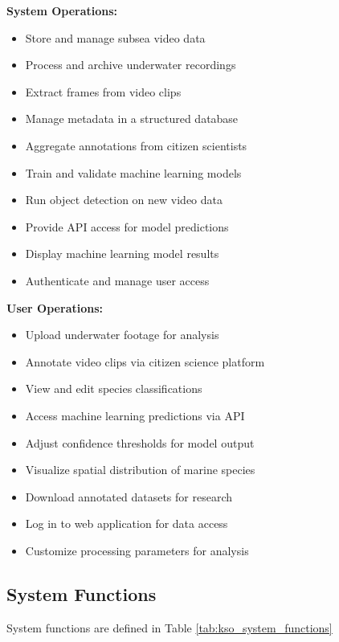 \textbf{System Operations:}
\begin{itemize}
    \item Store and manage subsea video data
    \item Process and archive underwater recordings
    \item Extract frames from video clips
    \item Manage metadata in a structured database
    \item Aggregate annotations from citizen scientists
    \item Train and validate machine learning models
    \item Run object detection on new video data
    \item Provide API access for model predictions
    \item Display machine learning model results
    \item Authenticate and manage user access
\end{itemize}
\textbf{User Operations:}
\begin{itemize}
    \item Upload underwater footage for analysis
    \item Annotate video clips via citizen science platform
    \item View and edit species classifications
    \item Access machine learning predictions via API
    \item Adjust confidence thresholds for model output
    \item Visualize spatial distribution of marine species
    \item Download annotated datasets for research
    \item Log in to web application for data access
    \item Customize processing parameters for analysis
\end{itemize}

\subsection{System Functions}

System functions are defined in Table \ref{tab:kso_system_functions}

